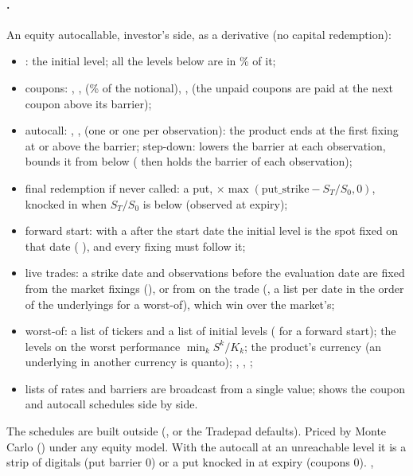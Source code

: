 \paragraph{.} An equity autocallable, investor's side, as a derivative (no capital
redemption):
\begin{itemize}[nosep]
  \item {}: the initial level; all the levels below are in \% of it;
  \item coupons: , ,  (\% of the
        notional), ,  (the unpaid coupons are paid at the next coupon above its
        barrier);
  \item autocall: , ,  (one or
        one per observation): the product ends at the first fixing at or above the barrier; step-down:
         lowers the barrier at each observation,  bounds it from below
        ( then holds the barrier of each observation);
  \item final redemption if never called: a put,  $\times \max(\text{put\_strike} -
        S_T/S_0, 0)$, knocked in when $S_T/S_0$ is below  (observed at expiry);
  \item forward start: with a  after the start date the initial level is the spot fixed on that
        date ( ), and every fixing must follow it;
  \item live trades: a strike date and observations before the evaluation date are fixed from the market fixings
        (), or from  on the trade (, a list per date in the
        order of the underlyings for a worst-of), which win over the market's;
  \item worst-of:  a list of tickers and  a list of initial levels ( for a
        forward start); the levels on the worst performance $\min_k S^k / K_k$;  the product's currency
        (an underlying in another currency is quanto); , , ;
  \item lists of rates and barriers are broadcast from a single value;  shows the coupon
        and autocall schedules side by side.
\end{itemize}
The schedules are built outside (, or the Tradepad defaults). Priced by Monte Carlo
() under any equity model. With the autocall at an unreachable level it is a strip of
digitals (put barrier 0) or a put knocked in at expiry (coupons 0). ,
